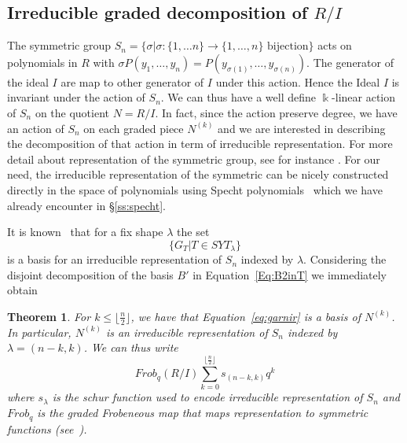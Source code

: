 \documentclass[12pt,reqno]{amsart}
\theoremstyle{plain}
\newtheorem{theorem}{Theorem}[section]
\theoremstyle{definition}
\def\field{\Bbbk}
\begin{document}
\subsection{Irreducible graded decomposition of $R/I$}\label{ss:irreducible}
The symmetric group $S_n=\big\{ \sigma \big| \sigma\colon \{1,\ldots n\}\to\{1,\ldots,n\}\text{ bijection}\big\}$ acts on polynomials in $R$ with 
$\sigma P(y_1,\ldots,y_n)=P(y_{\sigma(1)},\ldots,y_{\sigma(n)})$. The generator of the ideal $I$ are map to other generator of $I$ under this action. Hence the Ideal $I$ is invariant under the action of $S_n$. We can thus have a well define $\field$-linear action of $S_n$ on the quotient $N=R/I$. In fact, since the  action preserve degree, we have an action of $S_n$ on each graded piece $N^{(k)}$ and we are interested in describing the decomposition of that action in term of irreducible representation. For more detail about representation of the symmetric group, see for instance \cite{Sagan}. For our need, the irreducible representation of the symmetric can be nicely constructed directly in the space of polynomials using Specht polynomials~\cite{Specht} which we have already encounter in \S\ref{ss:specht}.

It is known~\cite{Sagan,Specht} that for a fix shape $\lambda$ the set 
\begin{equation}\label{eq:garnir}
 \big\{G_T\big| T \in SYT_\lambda\big\}
 \end{equation}
  is a basis for an irreducible representation 
of $S_n$ indexed  by   $\lambda$. 
Considering the disjoint decomposition of the basis $B'$ in  Equation~\ref{Eq:B2inT} we immediately obtain
\begin{theorem}
    For $k\le \lfloor \frac{n}{2} \rfloor$, we have that Equation~\eqref{eq:garnir} is a basis of $N^{(k)}$. In particular, $N^{(k)}$ is an irreducible representation of $S_n$
    indexed by $\lambda=(n-k,k)$. We can thus write
    $$ Frob_q(R/I) \sum_{k=0}^{ \lfloor \frac{n}{2} \rfloor} s_{(n-k,k)} q^k$$
    where $s_\lambda$  is the schur function used to encode irreducible representation of $S_n$ and $Frob_q$ is the graded Frobeneous map that maps representation to symmetric functions (see~\cite{Sagan,Macdonald}).
\end{theorem}


\small
  

\end{document}
